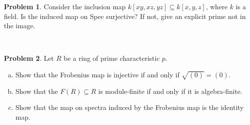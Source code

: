 \documentclass[11pt]{article}
\theoremstyle{definition}
\newtheorem{problem}{Problem}
\begin{document}
%
%
%
%





\begin{problem}
	Consider the inclusion map $k[xy,xz,yz] \subseteq k[x,y,z]$, where $k$ is a field. Is the induced map on Spec surjective? If not, give an explicit prime not in the image.
\end{problem}


\


\noindent
{} 

\begin{problem}
	Let $R$ be a ring of prime characteristic $p$. 
	\begin{enumerate}[a)]
	\item Show that the Frobenius map is injective if and only if $\sqrt{(0)} = (0)$.
	\item Show that the $F(R) \subseteq R$ is module-finite if and only if it is algebra-finite.
	\item Show that the map on spectra induced by the Frobenius map is the identity map.
	\end{enumerate}
\end{problem}
\end{document}
